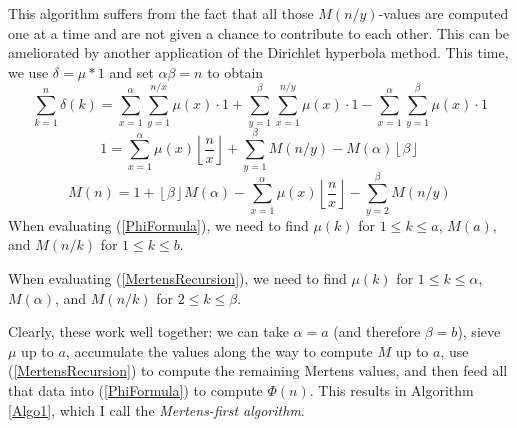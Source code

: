 \documentclass[12pt]{article}
\newcommand{\eqn}[1]{\begin{displaymath} #1 \end{displaymath}}
\newcommand{\neqn}[1]{\begin{equation} #1 \end{equation}}
\newcommand{\floor}[1]{{\left\lfloor #1 \right\rfloor}}
\newcommand{\floordiv}[2]{\floor{\frac{#1}{#2}}}
\begin{document}
This algorithm suffers from the fact that all those $M(n/y)$-values are computed one at a time and are not given a chance to contribute to each other.  This can be ameliorated by another application of the Dirichlet hyperbola method.  This time, we use $\delta = \mu * 1$ and set $\alpha\beta=n$ to obtain
\eqn{\sum_{k=1}^n \delta(k) = \sum_{x=1}^{\alpha}\sum_{y=1}^{n/x} \mu(x) \cdot 1 + \sum_{y=1}^{\beta}\sum_{x=1}^{n/y} \mu(x) \cdot 1 - \sum_{x=1}^{\alpha}\sum_{y=1}^{\beta} \mu(x) \cdot 1}
\eqn{1 = \sum_{x=1}^{\alpha} \mu(x) \floordiv{n}{x} + \sum_{y=1}^{\beta} M(n/y) - M(\alpha) \floor{\beta}}
\neqn{M(n) = 1 + \floor{\beta} M(\alpha) - \sum_{x=1}^{\alpha} \mu(x) \floordiv{n}{x} - \sum_{y=2}^{\beta} M(n/y) \label{MertensRecursion}}
When evaluating (\ref{PhiFormula}), we need to find $\mu(k)$ for $1 \leq k \leq a$, $M(a)$, and $M(n/k)$ for $1 \leq k \leq b$.

When evaluating (\ref{MertensRecursion}), we need to find $\mu(k)$ for $1 \leq k \leq \alpha$, $M(\alpha)$, and $M(n/k)$ for $2 \leq k \leq \beta$.

Clearly, these work well together: we can take $\alpha=a$ (and therefore $\beta=b$), sieve $\mu$ up to $a$, accumulate the values along the way to compute $M$ up to $a$, use (\ref{MertensRecursion}) to compute the remaining Mertens values, and then feed all that data into (\ref{PhiFormula}) to compute $\Phi(n)$.  This results in Algorithm \ref{Algo1}, which I call the \emph{Mertens-first algorithm}.
\end{document}
